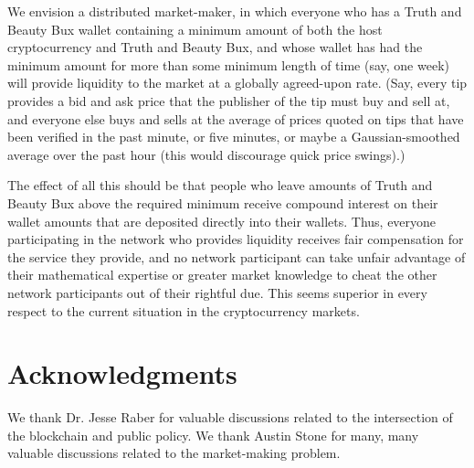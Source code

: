 \documentclass{article}
\begin{document}
We envision a distributed market-maker, in which everyone who has a
Truth and Beauty Bux wallet containing a minimum amount of both the
host cryptocurrency and Truth and Beauty Bux, and whose wallet has had
the minimum amount for more than some minimum length of time (say, one
week) will provide liquidity to the market at a globally agreed-upon
rate. (Say, every tip provides a bid and ask price that the publisher
of the tip must buy and sell at, and everyone else buys and sells at
the average of prices quoted on tips that have been verified in the
past minute, or five minutes, or maybe a Gaussian-smoothed average
over the past hour (this would discourage quick price swings).)

The effect of all this should be that people who leave amounts of
Truth and Beauty Bux above the required minimum receive compound
interest on their wallet amounts that are deposited directly into
their wallets. Thus, everyone participating in the network who
provides liquidity receives fair compensation for the service they
provide, and no network participant can take unfair advantage of their
mathematical expertise or greater market knowledge to cheat the other
network participants out of their rightful due. This seems superior in
every respect to the current situation in the cryptocurrency markets.

\section{Acknowledgments}

We thank Dr. Jesse Raber for valuable discussions related to the
intersection of the blockchain and public policy. We thank Austin
Stone for many, many valuable discussions related to the market-making
problem.
\end{document}
